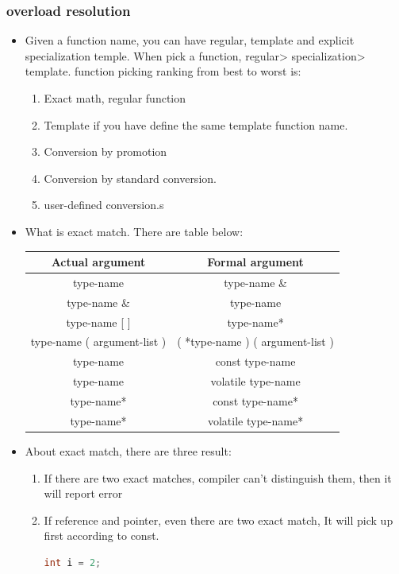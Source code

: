 \documentclass[a4paper,12pt,twoside]{book}
\begin{document}
\subsubsection{overload resolution}
\begin{itemize}
\item Given a function name, you can have regular, template and explicit specialization temple. When pick a function, regular> specialization> template. function picking ranking from best to worst is:
\begin{enumerate}
\item Exact math, regular function
\item Template if you have define the same template function name.
\item Conversion by promotion
\item Conversion by standard conversion.
\item user-defined conversion.s
\end{enumerate}

\item What is exact match. There are table below:

\begin{tabular}{|c|c|}
\hline
Actual argument & Formal argument \\
\hline
type-name & type-name \& \\
\hline
type-name \& & type-name \\ \hline
type-name [ ] &  type-name* \\ \hline
type-name ( argument-list ) & ( *type-name ) ( argument-list ) \\ \hline
type-name  & const type-name \\ \hline
type-name  &  volatile  type-name \\ \hline
type-name*  & const type-name*  \\ \hline
type-name*  & volatile  type-name*  \\  \hline
\end{tabular}

\item About exact match, there are three result:
\begin{enumerate}
\item If there are two exact matches, compiler can't distinguish them, then it will report error
\item If reference and pointer, even there are two exact match, It will pick up first according to const.
\begin{lstlisting}[frame=single, language=c++]
int i = 2;


\end{lstlisting}
\end{enumerate}
\end{itemize}
\end{document}
